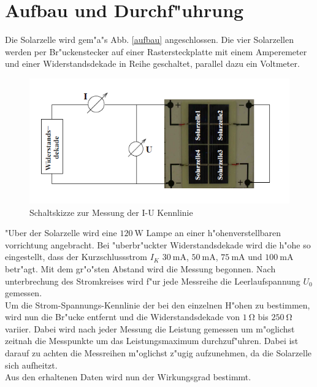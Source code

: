 \section{Aufbau und Durchf"uhrung}
	\label{sec:durchfuehrung}

	Die Solarzelle wird gem"a"s Abb. \eqref{aufbau} angeschlossen.
	Die vier Solarzellen werden per Br"uckenstecker auf einer Rastersteckplatte mit einem  Amperemeter und einer Widerstandsdekade in Reihe geschaltet, parallel dazu ein Voltmeter.

	\begin{figure}[htbp]
		\centering
		\includegraphics[width = 12cm]{img/aufbau.PNG}
		\caption{Schaltskizze zur Messung der I-U Kennlinie \cite{anleitung}}
		\label{aufbau}
	\end{figure}

	"Uber der Solarzelle wird eine $\SI{120}{\watt}$ Lampe an einer h"ohenverstellbaren vorrichtung angebracht.
	Bei "uberbr"uckter Widerstandsdekade wird die h"ohe so eingestellt, dass der Kurzschlussstrom $I_K$ $\SI{30}{\milli\ampere}$, $\SI{50}{\milli\ampere}$, $\SI{75}{\milli\ampere}$ und $\SI{100}{\milli\ampere}$ betr"agt.
	Mit dem gr"o"sten Abstand wird die Messung begonnen.
	Nach unterbrechung des Stromkreises wird f"ur jede Messreihe die Leerlaufspannung $U_0$ gemessen.\\
	Um die Strom-Spannungs-Kennlinie der bei den einzelnen H"ohen zu bestimmen, wird nun die Br"ucke entfernt und die Widerstandsdekade von $\SI{1}{\ohm}$ bis $\SI{250}{\ohm}$ variier.
	Dabei wird nach jeder Messung die Leistung gemessen um m"oglichst zeitnah die Messpunkte um das Leistungsmaximum durchzuf"uhren.
	Dabei ist darauf zu achten die Messreihen m"oglichst z"ugig aufzunehmen, da die Solarzelle sich aufheitzt.\\
	Aus den erhaltenen Daten wird nun der Wirkungsgrad bestimmt.